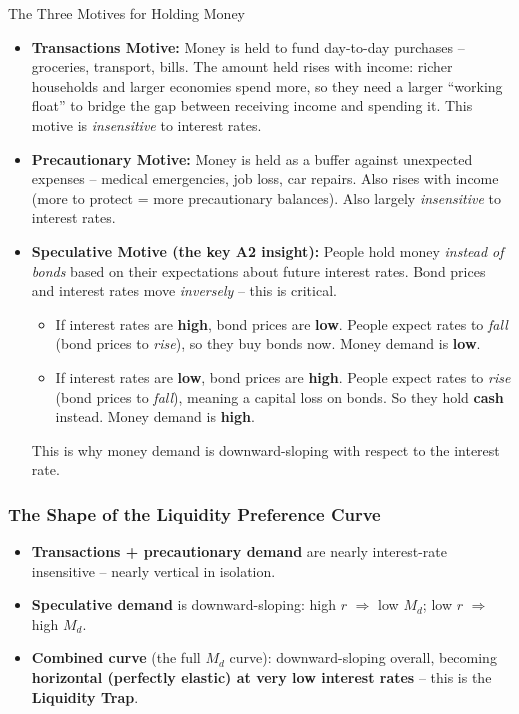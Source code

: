 \documentclass[11pt, a4paper, twoside]{book}
\begin{document}
\begin{keyterm}{The Three Motives for Holding Money}
\begin{itemize}
  \item \textbf{Transactions Motive:} Money is held to fund day-to-day purchases -- groceries, transport, bills. The amount held rises with income: richer households and larger economies spend more, so they need a larger ``working float'' to bridge the gap between receiving income and spending it. This motive is \emph{insensitive} to interest rates.
  \item \textbf{Precautionary Motive:} Money is held as a buffer against unexpected expenses -- medical emergencies, job loss, car repairs. Also rises with income (more to protect = more precautionary balances). Also largely \emph{insensitive} to interest rates.
  \item \textbf{Speculative Motive (the key A2 insight):} People hold money \emph{instead of bonds} based on their expectations about future interest rates. Bond prices and interest rates move \emph{inversely} -- this is critical.
  \begin{itemize}
    \item If interest rates are \textbf{high}, bond prices are \textbf{low}. People expect rates to \textit{fall} (bond prices to \textit{rise}), so they buy bonds now. Money demand is \textbf{low}.
    \item If interest rates are \textbf{low}, bond prices are \textbf{high}. People expect rates to \textit{rise} (bond prices to \textit{fall}), meaning a capital loss on bonds. So they hold \textbf{cash} instead. Money demand is \textbf{high}.
  \end{itemize}
  This is why money demand is downward-sloping with respect to the interest rate.
\end{itemize}
\end{keyterm}

\subsubsection{The Shape of the Liquidity Preference Curve}

\begin{itemize}
  \item \textbf{Transactions + precautionary demand} are nearly interest-rate insensitive -- nearly vertical in isolation.
  \item \textbf{Speculative demand} is downward-sloping: high $r$ $\Rightarrow$ low $M_d$; low $r$ $\Rightarrow$ high $M_d$.
  \item \textbf{Combined curve} (the full $M_d$ curve): downward-sloping overall, becoming \textbf{horizontal (perfectly elastic) at very low interest rates} -- this is the \textbf{Liquidity Trap}.
\end{itemize}
\end{document}
